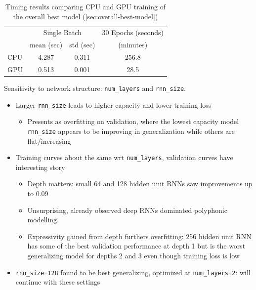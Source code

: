 \begin{table}[tb]
  \centering
  \caption{Timing results comparing CPU and GPU training of the overall best model (\vref{sec:overall-best-model})}
  \label{tab:gpu-training}
  \begin{tabular}{l c c c}
    \toprule
    \multirow{2}{*}{} & \multicolumn{2}{c}{Single Batch} & 30 Epochs (seconds) \\
    \cmidrule{2-4}
    & mean (sec) & std (sec) & (minutes)\\
    \midrule
    CPU & 4.287 & 0.311 & 256.8\\
    GPU & 0.513 & 0.001 &  28.5\\
    \bottomrule
  \end{tabular}
\end{table}


Sensitivity to network structure: \texttt{num\_layers} and \texttt{rnn\_size}.
\begin{itemize}
    \item Larger \texttt{rnn\_size} leads to higher capacity and lower training loss
        \begin{itemize}
            \item Presents as overfitting on validation, where the lowest capacity
                model \texttt{rnn\_size} appears to be improving in generalization while
                others are flat/increasing
        \end{itemize}
    \item Training curves about the same wrt \texttt{num\_layers}, validation curves have interesting story
        \begin{itemize}
            \item Depth matters: small 64 and 128 hidden unit RNNs saw improvements up to 0.09
            \item Unsurprising, \citet{pascanu2013construct} already observed deep RNNs dominated polyphonic modelling.
            \item Expressivity gained from depth furthers overfitting: 256
                hidden unit RNN has some of the best validation performance at
                depth 1 but is the worst generalizing model for depths 2
                and 3 even though training loss is low
        \end{itemize}
    \item \texttt{rnn\_size=128} found to be best generalizing, optimized at
        \texttt{num\_layers=2}: will continue with these settings
\end{itemize}

